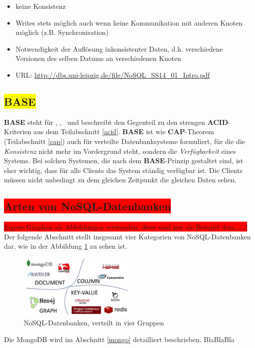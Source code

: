 \begin{itemize}
\item keine Konsistenz
\item Writes stets möglich auch wenn keine Kommunikation mit anderen Knoten möglich
(z.B. Synchronisation)
\item Notwendigkeit der Auflösung inkonsistenter Daten, d.h. verschiedene Versionen des
selben Datums an verschiedenen Knoten
\item URL: \url{http://dbs.uni-leipzig.de/file/NoSQL_SS14_01_Intro.pdf}
\end{itemize}

\subsection{\colorbox{yellow}{BASE}}
\textbf{BASE} steht für \BAse, \baSe, \basE\ und beschreibt den Gegenteil zu den strengen \textbf{ACID}-Kriterien aus dem Teilabschnitt \ref{acid}. \textbf{BASE} ist wie \textbf{CAP}-Theorem (Teilabschnitt \ref{cap}) auch für verteilte Datenbanksysteme formuliert, für die die \textit{Konsistenz} nicht mehr im Vordergrund steht, sondern die \textit{Verfügbarkeit} eines Systems. Bei solchen Systemen, die nach dem \textbf{BASE}-Prinzip gestaltet sind, ist eher wichtig, dass für alle Clients das System ständig verfügbar ist. Die Clients müssen nicht unbedingt zu dem gleichen Zeitpunkt die gleichen Daten sehen.

\subsection{\colorbox{red}{Arten von NoSQL-Datenbanken}}\label{categoryNoSQL}
\colorbox{red}{Eigene Graphen als Abbildungen verwenden, diese sind nur als Beispiel drin......!}
Der folgende Abschnitt stellt insgesamt vier Kategorien von NoSQL-Datenbanken dar, wie in der Abbildung \ref{img:nosqlgroups} zu sehen ist.
\begin{figure}[H]
\centering
\includegraphics[width=0.5\textwidth]{resources/nosqlgroups}
\caption[NoSQL-Datenbanken]{NoSQL-Datenbanken, verteilt in vier Gruppen\protect\footnotemark}
\label{img:nosqlgroups}
\end{figure}
Die MongoDB wird im Abschnitt \ref{mongo} detailliert beschrieben. BlaBlaBla
